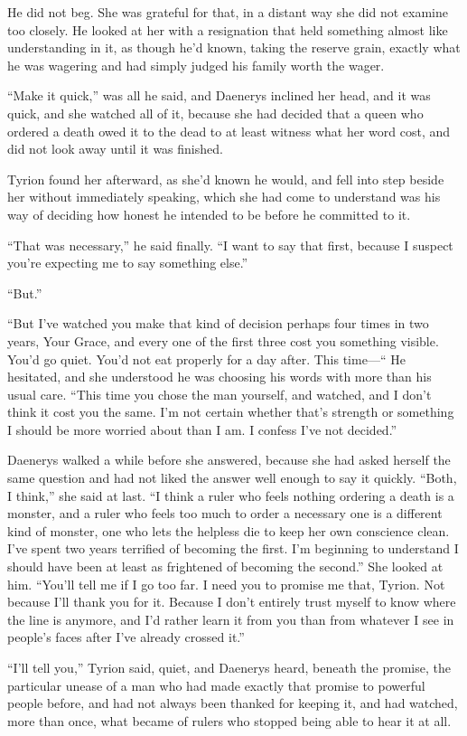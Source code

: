 He did not beg. She was grateful for that, in a distant way she did not examine too closely. He looked at her with a resignation that held something almost like understanding in it, as though he’d known, taking the reserve grain, exactly what he was wagering and had simply judged his family worth the wager.

“Make it quick,” was all he said, and Daenerys inclined her head, and it was quick, and she watched all of it, because she had decided that a queen who ordered a death owed it to the dead to at least witness what her word cost, and did not look away until it was finished.

\sceneBreak

Tyrion found her afterward, as she’d known he would, and fell into step beside her without immediately speaking, which she had come to understand was his way of deciding how honest he intended to be before he committed to it.

“That was necessary,” he said finally. “I want to say that first, because I suspect you’re expecting me to say something else.”

“But.”

“But I’ve watched you make that kind of decision perhaps four times in two years, Your Grace, and every one of the first three cost you something visible. You’d go quiet. You’d not eat properly for a day after. This time—“ He hesitated, and she understood he was choosing his words with more than his usual care. “This time you chose the man yourself, and watched, and I don’t think it cost you the same. I’m not certain whether that’s strength or something I should be more worried about than I am. I confess I’ve not decided.”

Daenerys walked a while before she answered, because she had asked herself the same question and had not liked the answer well enough to say it quickly. “Both, I think,” she said at last. “I think a ruler who feels nothing ordering a death is a monster, and a ruler who feels too much to order a necessary one is a different kind of monster, one who lets the helpless die to keep her own conscience clean. I’ve spent two years terrified of becoming the first. I’m beginning to understand I should have been at least as frightened of becoming the second.” She looked at him. “You’ll tell me if I go too far. I need you to promise me that, Tyrion. Not because I’ll thank you for it. Because I don’t entirely trust myself to know where the line is anymore, and I’d rather learn it from you than from whatever I see in people’s faces after I’ve already crossed it.”

“I’ll tell you,” Tyrion said, quiet, and Daenerys heard, beneath the promise, the particular unease of a man who had made exactly that promise to powerful people before, and had not always been thanked for keeping it, and had watched, more than once, what became of rulers who stopped being able to hear it at all.
